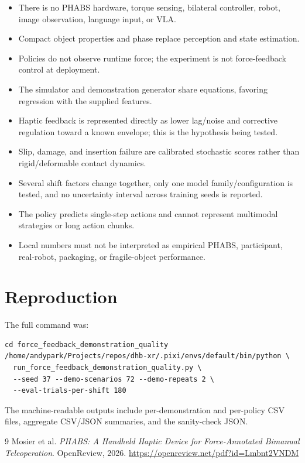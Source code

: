 \documentclass[11pt]{article}
\begin{document}
\begin{itemize}[leftmargin=1.5em]
\item There is no PHABS hardware, torque sensing, bilateral controller, robot, image observation, language input, or VLA.
\item Compact object properties and phase replace perception and state estimation.
\item Policies do not observe runtime force; the experiment is not force-feedback control at deployment.
\item The simulator and demonstration generator share equations, favoring regression with the supplied features.
\item Haptic feedback is represented directly as lower lag/noise and corrective regulation toward a known envelope; this is the hypothesis being tested.
\item Slip, damage, and insertion failure are calibrated stochastic scores rather than rigid/deformable contact dynamics.
\item Several shift factors change together, only one model family/configuration is tested, and no uncertainty interval across training seeds is reported.
\item The policy predicts single-step actions and cannot represent multimodal strategies or long action chunks.
\item Local numbers must not be interpreted as empirical PHABS, participant, real-robot, packaging, or fragile-object performance.
\end{itemize}

\section{Reproduction}

The full command was:
\begin{verbatim}
cd force_feedback_demonstration_quality
/home/andypark/Projects/repos/dhb-xr/.pixi/envs/default/bin/python \
  run_force_feedback_demonstration_quality.py \
  --seed 37 --demo-scenarios 72 --demo-repeats 2 \
  --eval-trials-per-shift 180
\end{verbatim}
The machine-readable outputs include per-demonstration and per-policy CSV files, aggregate CSV/JSON summaries, and the sanity-check JSON.

\begin{thebibliography}{9}
\bibitem{phabs} Mosier et al. \emph{PHABS: A Handheld Haptic Device for Force-Annotated Bimanual Teleoperation}. OpenReview, 2026. \url{https://openreview.net/pdf?id=Lmbnt2VNDM}
\end{thebibliography}
\end{document}
